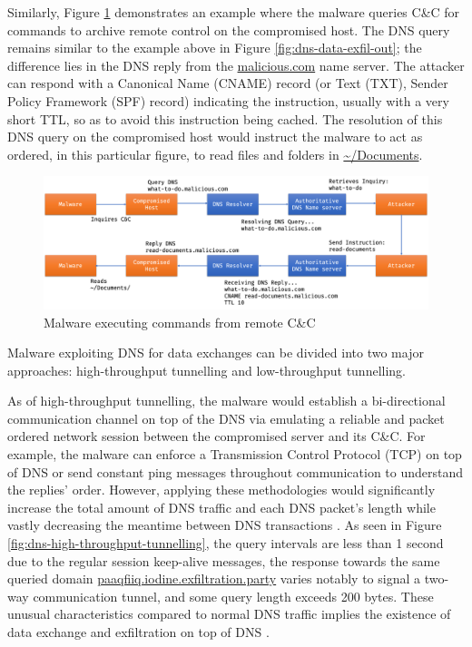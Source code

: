 \documentclass[a4paper]{report}
\begin{document}
Similarly, Figure \ref{fig:dns-data-exfil-cycle} demonstrates an example where the malware queries C\&C for commands to archive remote control on the compromised host. The DNS query remains similar to the example above in Figure \ref{fig:dns-data-exfil-out}; the difference lies in the DNS reply from the \url{malicious.com} name server. The attacker can respond with a Canonical Name (CNAME) record (or Text (TXT), Sender Policy Framework (SPF) record) indicating the instruction, usually with a very short TTL, so as to avoid this instruction being cached. The resolution of this DNS query on the compromised host would instruct the malware to act as ordered, in this particular figure, to read files and folders in \url{~/Documents}.

\begin{figure}[h!]
  \includegraphics[width=\textwidth]{imgs/dns-data-exfil-cycle.png}
  \caption{Malware executing commands from remote C\&C}
  \label{fig:dns-data-exfil-cycle}
\end{figure}

Malware exploiting DNS for data exchanges can be divided into two major approaches: high-throughput tunnelling and low-throughput tunnelling.

As of high-throughput tunnelling, the malware would establish a bi-directional communication channel on top of the DNS via emulating a reliable and packet ordered network session between the compromised server and its C\&C. For example, the malware can enforce a Transmission Control Protocol (TCP) on top of DNS or send constant ping messages throughout communication to understand the replies' order. However, applying these methodologies would significantly increase the total amount of DNS traffic and each DNS packet's length while vastly decreasing the meantime between DNS transactions \cite{nadler-2017, nadler-201936}. As seen in Figure \ref{fig:dns-high-throughput-tunnelling}, the query intervals are less than 1 second due to the regular session keep-alive messages, the response towards the same queried domain \url{paaqfiiq.iodine.exfiltration.party} varies notably to signal a two-way communication tunnel, and some query length exceeds 200 bytes. These unusual characteristics compared to normal DNS traffic implies the existence of data exchange and exfiltration on top of DNS \cite{nadler-2017}.
\end{document}
